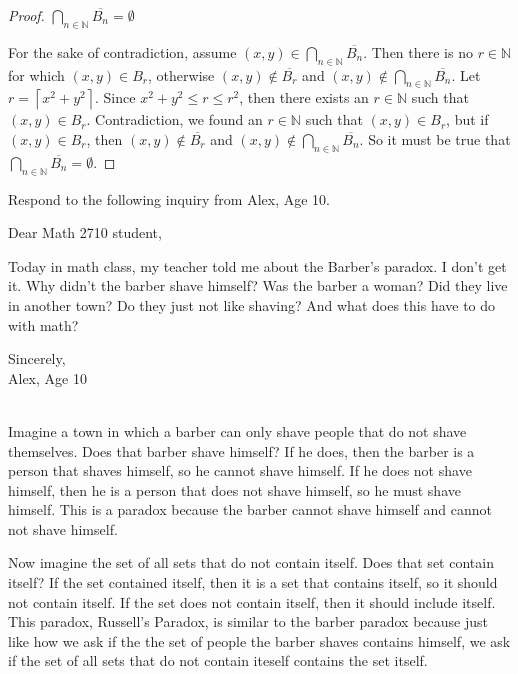 \documentclass[12 pt]{exam}
\begin{document}
\begin{questions}
\begin{solution}
\begin{proof} $\bigcap_{n\in\mathbb{N}}\overline{B_n} = \emptyset$

For the sake of contradiction, assume $(x, y) \in \bigcap_{n\in\mathbb{N}}\overline{B_n}$. Then there is no $r \in \mathbb{N}$ for which $(x, y) \in B_r$, otherwise $(x, y) \notin \overline{B_r}$ and $(x, y) \notin \bigcap_{n\in\mathbb{N}}\overline{B_n}$. Let $r = \left \lceil x^2 + y^2 \right\rceil$. Since $x^2 + y^2 \le r \le r^2$, then there exists an $r \in \mathbb{N}$ such that $(x, y) \in B_r$. Contradiction, we found an $r \in \mathbb{N}$ such that $(x, y) \in B_r$, but if $(x, y) \in B_r$, then $(x, y) \notin \overline{B_r}$ and $(x,y) \notin \bigcap_{n\in\mathbb{N}}\overline{B_n}$. So it must be true that $\bigcap_{n\in\mathbb{N}}\overline{B_n} = \emptyset$.
\end{proof}
\end{solution}

\question Respond to the following inquiry from Alex, Age 10. 

Dear Math 2710 student, 

Today in math class, my teacher told me about the Barber's paradox. I don't get it.  Why didn't the barber shave himself?  Was the barber a woman?  Did they live in another town? Do they just not like shaving? And what does this have to do with math?

Sincerely, \\
Alex, Age 10

\begin{solution} \\
Imagine a town in which a barber can only shave people that do not shave themselves. Does that barber shave himself? If he does, then the barber is a person that shaves himself, so he cannot shave himself. If he does not shave himself, then he is a person that does not shave himself, so he must shave himself. This is a paradox because the barber cannot shave himself and cannot not shave himself.

Now imagine the set of all sets that do not contain itself. Does that set contain itself? If the set contained itself, then it is a set that contains itself, so it should not contain itself. If the set does not contain itself, then it should include itself. This paradox, Russell's Paradox, is similar to the barber paradox because just like how we ask if the the set of people the barber shaves contains himself, we ask if the set of all sets that do not contain iteself contains the set itself.


\end{solution}
\end{questions}
\end{document}
